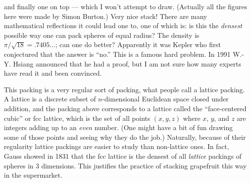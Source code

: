 \documentclass{article}
\begin{document}
and finally one on top --- which I won't attempt to draw.  
(Actually all the figures here were made by Simon Burton.)  Very nice
stack! There are many mathematical reflections it could lead one to, one
of which is: is this the \emph{densest} possible way one can pack
spheres of equal radius? The density is \(\pi/\sqrt{18} = .7405\ldots\);
can one do better? Apparently it was Kepler who first conjectured that
the answer is ``no.'' This is a famous hard problem. In 1991 W.-Y.
Hsiang announced that he had a proof, but I am not sure how many experts
have read it and been convinced.

This packing is a very regular sort of packing, what people call a
lattice packing. A lattice is a discrete subset of \(n\)-dimensional
Euclidean space closed under addition, and the packing above corresponds
to a lattice called the ``face-centered cubic'' or fcc lattice, which is
the set of all points \((x,y,z)\) where \(x\), \(y\), and \(z\) are
integers adding up to an \emph{even} number. (One might have a bit of
fun drawing some of those points and seeing why they do the job.)
Naturally, because of their regularity lattice packings are easier to
study than non-lattice ones. In fact, Gauss showed in 1831 that the fcc
lattice is the densest of all \emph{lattice} packings of spheres in 3
dimensions. This justifies the practice of stacking grapefruit this way
in the supermarket.
\end{document}
